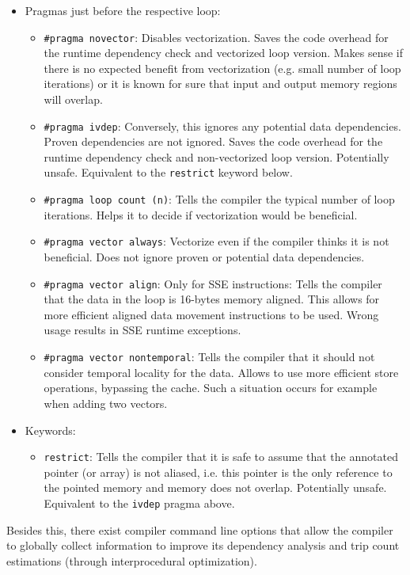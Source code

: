 \documentclass[11pt]{article}
\begin{document}
\begin{itemize}
\item Pragmas just before the respective loop:
\begin{itemize}
\item \texttt{\#pragma novector}: Disables vectorization. Saves the code overhead for the runtime dependency check and vectorized loop version. Makes sense if there is no expected benefit from vectorization (e.g. small number of loop iterations) or it is known for sure that input and output memory regions will overlap.
\item \texttt{\#pragma ivdep}: Conversely, this ignores any potential data dependencies. Proven dependencies are not ignored. Saves the code overhead for the runtime dependency check and non-vectorized loop version. Potentially unsafe. Equivalent to the \texttt{restrict} keyword below.
\item \texttt{\#pragma loop count (n)}: Tells the compiler the typical number of loop iterations. Helps it to decide if vectorization would be beneficial.
\item \texttt{\#pragma vector always}: Vectorize even if the compiler thinks it is not beneficial. Does not ignore proven or potential data dependencies.
\item \texttt{\#pragma vector align}: Only for SSE instructions: Tells the compiler that the data in the loop is 16-bytes memory aligned. This allows for more efficient aligned data movement instructions to be used. Wrong usage results in SSE runtime exceptions.
\item \texttt{\#pragma vector nontemporal}: Tells the compiler that it should not consider temporal locality for the data. Allows to use more efficient store operations, bypassing the cache. Such a situation occurs for example when adding two vectors.
\end{itemize}
\item Keywords:
\begin{itemize}
\item \texttt{restrict}: Tells the compiler that it is safe to assume that the annotated pointer (or array) is not aliased, i.e. this pointer is the only reference to the pointed memory and memory does not overlap. Potentially unsafe. Equivalent to the \texttt{ivdep} pragma above.
\end{itemize}
\end{itemize}

Besides this, there exist compiler command line options that allow the compiler to globally collect information to improve its dependency analysis and trip count estimations (through interprocedural optimization).
\end{document}
